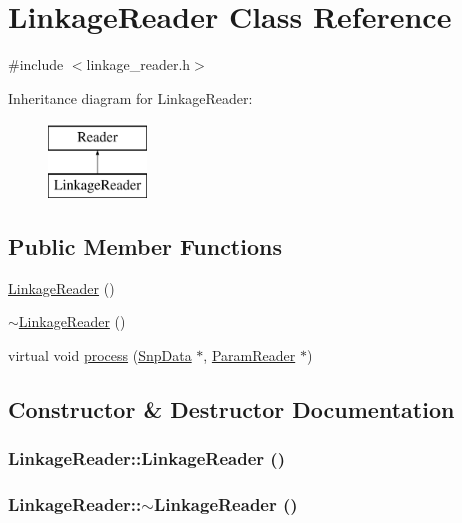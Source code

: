 \hypertarget{classLinkageReader}{
\section{LinkageReader Class Reference}
\label{classLinkageReader}
}


{\ttfamily \#include $<$linkage\_\-reader.h$>$}

Inheritance diagram for LinkageReader:\begin{figure}[H]
\begin{center}
\leavevmode
\includegraphics[height=2cm]{classLinkageReader}
\end{center}
\end{figure}
\subsection*{Public Member Functions}
\begin{DoxyCompactItemize}
\item 
\hyperlink{classLinkageReader_a2140f8868115116912be97afa7f970a5}{LinkageReader} ()
\item 
\hyperlink{classLinkageReader_a1422a6ab4deef5b8524ed24b90c4851b}{$\sim$LinkageReader} ()
\item 
virtual void \hyperlink{classLinkageReader_a808d3be4b0a2b3af8a7ec7fea963960b}{process} (\hyperlink{classSnpData}{SnpData} $\ast$, \hyperlink{classParamReader}{ParamReader} $\ast$)
\end{DoxyCompactItemize}


\subsection{Constructor \& Destructor Documentation}
\hypertarget{classLinkageReader_a2140f8868115116912be97afa7f970a5}{
\subsubsection[{LinkageReader}]{\setlength{\rightskip}{0pt plus 5cm}LinkageReader::LinkageReader ()}}
\label{classLinkageReader_a2140f8868115116912be97afa7f970a5}
\hypertarget{classLinkageReader_a1422a6ab4deef5b8524ed24b90c4851b}{
\subsubsection[{$\sim$LinkageReader}]{\setlength{\rightskip}{0pt plus 5cm}LinkageReader::$\sim$LinkageReader ()}}
\label{classLinkageReader_a1422a6ab4deef5b8524ed24b90c4851b}


